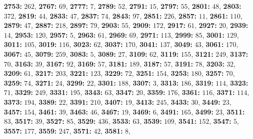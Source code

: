 \textsf{\bfseries 2753:} $262$, \textsf{\bfseries 2767:} $69$, \textsf{\bfseries 2777:} $7$, \textsf{\bfseries 2789:} $52$, \textsf{\bfseries 2791:} $15$, \textsf{\bfseries 2797:} $55$, \textsf{\bfseries 2801:} $48$, \textsf{\bfseries 2803:} $372$, \textsf{\bfseries 2819:} $44$, \textsf{\bfseries 2833:} $47$, \textsf{\bfseries 2837:} $74$, \textsf{\bfseries 2843:} $97$, \textsf{\bfseries 2851:} $226$, \textsf{\bfseries 2857:} $11$, \textsf{\bfseries 2861:} $110$, \textsf{\bfseries 2879:} $47$, \textsf{\bfseries 2887:} $218$, \textsf{\bfseries 2897:} $79$, \textsf{\bfseries 2903:} $55$, \textsf{\bfseries 2909:} $172$, \textsf{\bfseries 2917:} $61$, \textsf{\bfseries 2927:} $20$, \textsf{\bfseries 2939:} $14$, \textsf{\bfseries 2953:} $120$, \textsf{\bfseries 2957:} $5$, \textsf{\bfseries 2963:} $61$, \textsf{\bfseries 2969:} $69$, \textsf{\bfseries 2971:} $113$, \textsf{\bfseries 2999:} $85$, \textsf{\bfseries 3001:} $129$, \textsf{\bfseries 3011:} $105$, \textsf{\bfseries 3019:} $116$, \textsf{\bfseries 3023:} $62$, \textsf{\bfseries 3037:} $170$, \textsf{\bfseries 3041:} $137$, \textsf{\bfseries 3049:} $43$, \textsf{\bfseries 3061:} $170$, \textsf{\bfseries 3067:} $45$, \textsf{\bfseries 3079:} $259$, \textsf{\bfseries 3083:} $5$, \textsf{\bfseries 3089:} $27$, \textsf{\bfseries 3109:} $62$, \textsf{\bfseries 3119:} $155$, \textsf{\bfseries 3121:} $249$, \textsf{\bfseries 3137:} $70$, \textsf{\bfseries 3163:} $39$, \textsf{\bfseries 3167:} $92$, \textsf{\bfseries 3169:} $57$, \textsf{\bfseries 3181:} $189$, \textsf{\bfseries 3187:} $57$, \textsf{\bfseries 3191:} $78$, \textsf{\bfseries 3203:} $32$, \textsf{\bfseries 3209:} $61$, \textsf{\bfseries 3217:} $203$, \textsf{\bfseries 3221:} $123$, \textsf{\bfseries 3229:} $72$, \textsf{\bfseries 3251:} $154$, \textsf{\bfseries 3253:} $180$, \textsf{\bfseries 3257:} $70$, \textsf{\bfseries 3259:} $74$, \textsf{\bfseries 3271:} $24$, \textsf{\bfseries 3299:} $22$, \textsf{\bfseries 3301:} $188$, \textsf{\bfseries 3307:} $3$, \textsf{\bfseries 3313:} $186$, \textsf{\bfseries 3319:} $114$, \textsf{\bfseries 3323:} $71$, \textsf{\bfseries 3329:} $249$, \textsf{\bfseries 3331:} $195$, \textsf{\bfseries 3343:} $63$, \textsf{\bfseries 3347:} $20$, \textsf{\bfseries 3359:} $176$, \textsf{\bfseries 3361:} $116$, \textsf{\bfseries 3371:} $114$, \textsf{\bfseries 3373:} $194$, \textsf{\bfseries 3389:} $22$, \textsf{\bfseries 3391:} $210$, \textsf{\bfseries 3407:} $19$, \textsf{\bfseries 3413:} $245$, \textsf{\bfseries 3433:} $30$, \textsf{\bfseries 3449:} $23$, \textsf{\bfseries 3457:} $154$, \textsf{\bfseries 3461:} $39$, \textsf{\bfseries 3463:} $46$, \textsf{\bfseries 3467:} $19$, \textsf{\bfseries 3469:} $6$, \textsf{\bfseries 3491:} $165$, \textsf{\bfseries 3499:} $23$, \textsf{\bfseries 3511:} $83$, \textsf{\bfseries 3517:} $39$, \textsf{\bfseries 3527:} $85$, \textsf{\bfseries 3529:} $436$, \textsf{\bfseries 3533:} $63$, \textsf{\bfseries 3539:} $109$, \textsf{\bfseries 3541:} $152$, \textsf{\bfseries 3547:} $5$, \textsf{\bfseries 3557:} $177$, \textsf{\bfseries 3559:} $247$, \textsf{\bfseries 3571:} $42$, \textsf{\bfseries 3581:} $8$, 
